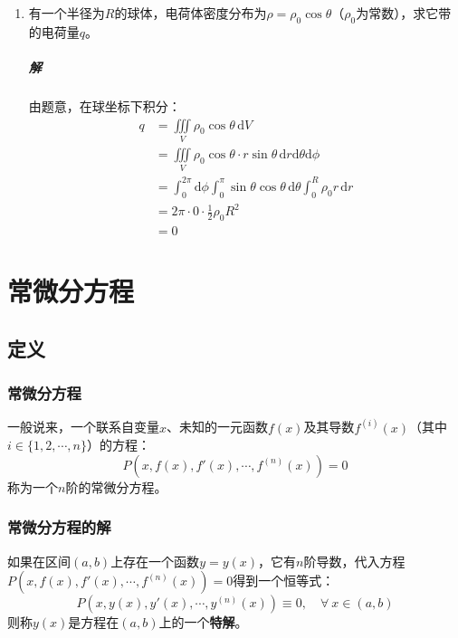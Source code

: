 \documentclass[fontset=none,openany,a4paper]{ctexbook}
\begin{document}
\begin{enumerate}
    \item 有一个半径为$R$的球体，电荷体密度分布为$\rho=\rho_0\cos\theta$（$\rho_0$为常数），求它带的电荷量$q$。

    \paragraph{解}

    由题意，在球坐标下积分：
    \begin{align*}
        q
        &= \iiint\limits_V \rho_0\cos\theta\,\mathrm{d}V \\
        &= \iiint\limits_V \rho_0\cos\theta \cdot r\sin\theta\,\mathrm{d}r\mathrm{d}\theta\mathrm{d}\phi \\
        &= \int_0^{2\pi} \mathrm{d}\phi \int_0^\pi \sin\theta\cos\theta\,\mathrm{d}\theta \int_0^R \rho_0 r\,\mathrm{d}r \\
        &= 2\pi \cdot 0 \cdot \frac{1}{2}\rho_0 R^2 \\
        &= 0
    \end{align*}

\end{enumerate}

\chapter{常微分方程}

\section{定义}

\subsection{常微分方程}

一般说来，一个联系自变量$x$、未知的一元函数$f(x)$及其导数$f^{(i)}(x)$（其中$i\in\{1,2,\cdots,n\}$）的方程：
\[
P(x, f(x), f'(x), \cdots, f^{(n)}(x)) = 0
\]
称为一个$n$阶的常微分方程。

\subsection{常微分方程的解}

如果在区间$(a,b)$上存在一个函数$y=y(x)$，它有$n$阶导数，代入方程$P(x,f(x),f'(x),\cdots,f^{(n)}(x))=0$得到一个恒等式：
\[
P(x,y(x),y'(x),\cdots,y^{(n)}(x)) \equiv 0,\quad \forall\ x\in(a,b)
\]
则称$y(x)$是方程在$(a,b)$上的一个\textbf{特解}。
\end{document}
